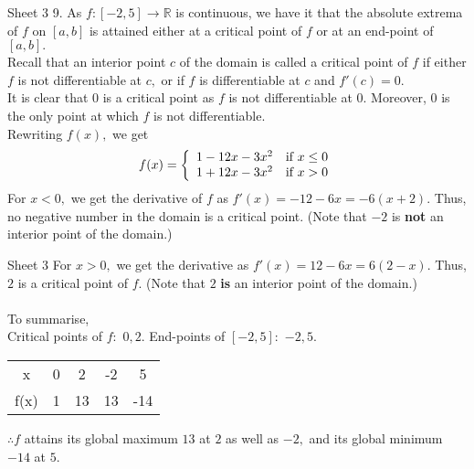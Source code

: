 \documentclass[handout, aspectratio=169]{beamer}
\begin{document}
\begin{frame}{Sheet 3}
	9. As $f:[-2, 5] \to \mathbb{R}$ is continuous, we have it that the absolute extrema of $f$ on $[a, b]$ is attained either at a critical point of $f$ or at an end-point of $[a, b].$\\
	Recall that an interior point $c$ of the domain is called a critical point of $f$ if either $f$ is not differentiable at $c,$ or if $f$ is differentiable at $c$ and $f'(c) = 0.$\\
	It is clear that $0$ is a critical point as $f$ is not differentiable at $0.$ Moreover, $0$ is the only point at which $f$ is not differentiable.\\
	Rewriting $f(x),$ we get
	\[f(x) = \left\{\begin{array}{l r}
		1 - 12x - 3x^2  & \text{if } x \le 0\\
		1 + 12x - 3x^2	& \text{if } x > 0
	\end{array}
	\right.\]
	For $x < 0,$ we get the derivative of $f$ as $f'(x) = -12 - 6x = -6(x + 2).$ Thus, no negative number in the domain is a critical point. (Note that $-2$ is \textbf{not} an interior point of the domain.)
\end{frame}
\begin{frame}{Sheet 3}
	For $x > 0,$ we get the derivative as $f'(x) = 12 - 6x = 6(2 - x).$ Thus, $2$ is a critical point of $f.$ (Note that $2$ \textbf{is} an interior point of the domain.)\\~\\
	To summarise,\\
	Critical points of $f:$ $0, 2.$ End-points of $[-2, 5]:$ $-2, 5.$\\
	\begin{center}
		\begin{tabular}{|c| c c c c|}
		\hline
		x & 0 & 2 & -2 & 5\\
		f(x) & 1 & 13 & 13 & -14 \\
		\hline
		\end{tabular}
	\end{center}
	$\therefore f$ attains its global maximum $13$ at $2$ as well as $-2,$ and its global minimum $-14$ at $5.$
\end{frame}
\end{document}
